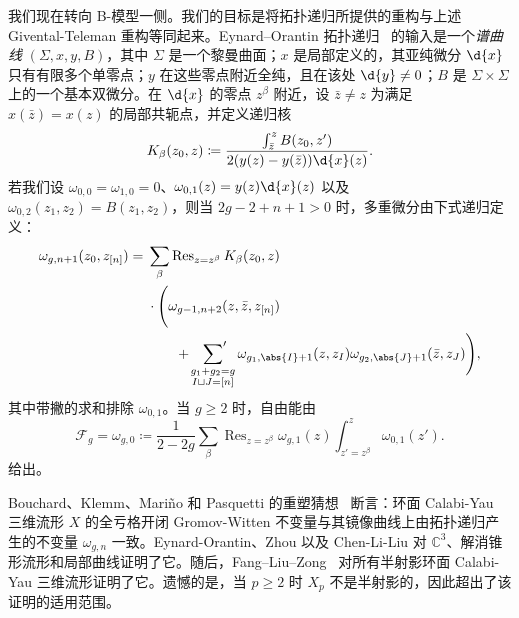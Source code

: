 \documentclass{amsart}
\theoremstyle{definition}
\theoremstyle{remark}
\theoremstyle{plain}
\theoremstyle{definition}
\theoremstyle{remark}
\newcommand{\C}{\mathbb{C}}
\newcommand{\mc}[1]{\mathcal{#1}}
\newcommand{\on}[1]{\operatorname{#1}}
\newcommand{\1}{\mathbf{1}}
\newcommand{\2}{\mathbf{2}}
\newcommand{\3}{\mathbf{3}}
\begin{document}
我们现在转向 B-模型一侧。我们的目标是将拓扑递归所提供的重构与上述 Givental-Teleman 重构等同起来。Eynard--Orantin 拓扑递归~\cite{EO2007} 的输入是一个\textit{谱曲线} \((\Sigma,x,y,B)\)，其中 \(\Sigma\) 是一个黎曼曲面；\(x\) 是局部定义的，其亚纯微分 \(\d{x}\) 只有有限多个单零点；\(y\) 在这些零点附近全纯，且在该处 \(\d{y} \neq 0\)；\(B\) 是 \(\Sigma \times \Sigma\) 上的一个基本双微分。在 \(\d{x}\) 的零点 \(z^{\beta}\) 附近，设 \(\bar{z} \neq z\) 为满足 \(x(\bar{z}) = x(z)\) 的局部共轭点，并定义递归核
\[ K_{\beta}(z_0,z) \coloneqq \frac{\int_{\bar{z}}^z B(z_0,z')}{2(y(z)-y(\bar{z}))\d{x}(z)}. \]
若我们设 \(\omega_{0,0} = \omega_{1,0} = 0\)、\(\omega_{0,1}(z) = y(z)\d{x}(z)\) 以及 \(\omega_{0,2}(z_1,z_2) = B(z_1,z_2)\)，则当 \(2g-2+n+1 > 0\) 时，多重微分由下式递归定义：
\begin{align*}
    \omega_{g,n+1}(z_0,z_{[n]}) ={}& \sum_{\beta}\on{Res}_{z = z^{\beta}} K_{\beta}(z_0,z) \\
    &\cdot \Bigg( \omega_{g-1,n+2}(z,\bar{z},z_{[n]}) \\
    &\qquad + \sideset{}{'}\sum_{\substack{g_1+g_2 = g \\ I \sqcup J = [n]}}\omega_{g_1,\abs{I}+1}(z,z_I)\omega_{g_2,\abs{J}+1}(\bar{z},z_J)\Bigg),
\end{align*}
其中带撇的求和排除 \(\omega_{0,1}\)。当 \(g \geq 2\) 时，自由能由
\[ \mc{F}_g = \omega_{g,0} \coloneqq \frac{1}{2-2g}\sum_{\beta}\on{Res}_{z=z^{\beta}}\omega_{g,1}(z)\int_{z'=z^{\beta}}^z \omega_{0,1}(z'). \]
给出。

Bouchard、Klemm、Mari\~{n}o 和 Pasquetti 的重塑猜想~\cite{BKMP2009} 断言：环面 Calabi-Yau 三维流形 \(X\) 的全亏格开闭 Gromov-Witten 不变量与其镜像曲线上由拓扑递归产生的不变量 \(\omega_{g,n}\) 一致。Eynard-Orantin、Zhou 以及 Chen-Li-Liu 对 \(\C^3\)、解消锥形流形和局部曲线证明了它。随后，Fang--Liu--Zong~\cite{FLZ2020} 对所有半射影环面 Calabi-Yau 三维流形证明了它。遗憾的是，当 \(p \geq 2\) 时 \(X_p\) 不是半射影的，因此超出了该证明的适用范围。
\end{document}
